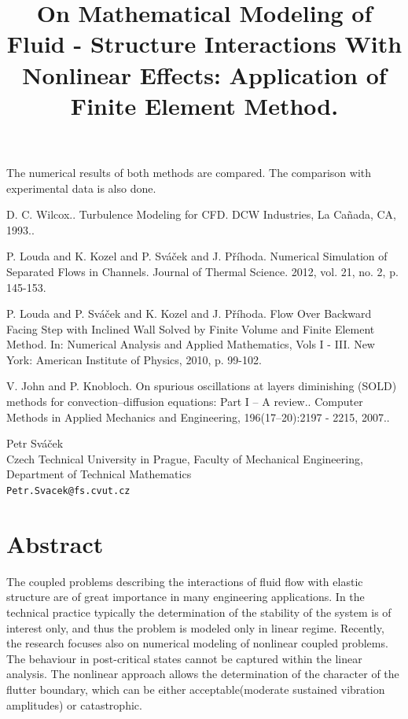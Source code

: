 \documentclass[article,A4,11pt]{llncs}%
\begin{document}
The numerical results of both methods are compared. The comparison with experimental data is also done.



\begin{thebibliography}{10}
{\sc D. C. Wilcox.}. {Turbulence Modeling for CFD}. DCW Industries, La Ca\~{n}ada, CA, 1993..

{\sc P. Louda and K. Kozel and P. Sváček and J. Příhoda}. {Numerical Simulation of Separated Flows in Channels}. Journal of Thermal Science. 2012, vol. 21, no. 2, p. 145-153.

{\sc P. Louda and P. Sváček and K. Kozel and J. Příhoda}. { Flow Over Backward Facing Step with Inclined Wall Solved by Finite Volume and Finite Element Method}. In: Numerical Analysis and Applied Mathematics, Vols I - III. New York: American Institute of Physics, 2010, p. 99-102.

{\sc V. John and P. Knobloch}. {On spurious oscillations at layers diminishing (SOLD) methods for convection–diffusion equations: Part I – A review.}. Computer Methods in Applied Mechanics and Engineering, 196(17–20):2197 - 2215, 2007..
\end{thebibliography}

\title{On Mathematical Modeling of Fluid - Structure Interactions With Nonlinear Effects: Application of Finite Element Method.}
 \author{} \institute{}
\maketitle
\begin{center}
{\large Petr  Sváček}\\
Czech Technical University in Prague, Faculty of Mechanical Engineering, Department of Technical Mathematics\\
{\tt Petr.Svacek@fs.cvut.cz}
\end{center}

\section*{Abstract}
The coupled problems describing the interactions of fluid flow with elastic structure are of great importance in many engineering applications. 
In the technical practice typically the determination of the stability of the system is of interest only, and thus the 
problem is modeled only in linear regime. Recently, the research focuses also on 
numerical modeling of nonlinear coupled problems. The behaviour in post-critical states
cannot be captured within the linear analysis. 
The nonlinear approach allows the determination of the character of the flutter boundary, which can be either acceptable(moderate sustained vibration amplitudes) or catastrophic.
\end{document}
